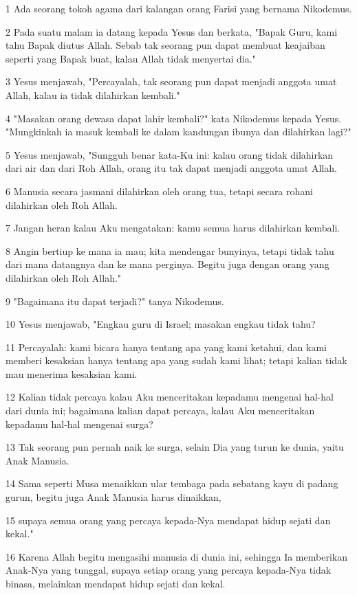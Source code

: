 \par 1 Ada seorang tokoh agama dari kalangan orang Farisi yang bernama Nikodemus.
\par 2 Pada suatu malam ia datang kepada Yesus dan berkata, "Bapak Guru, kami tahu Bapak diutus Allah. Sebab tak seorang pun dapat membuat keajaiban seperti yang Bapak buat, kalau Allah tidak menyertai dia."
\par 3 Yesus menjawab, "Percayalah, tak seorang pun dapat menjadi anggota umat Allah, kalau ia tidak dilahirkan kembali."
\par 4 "Masakan orang dewasa dapat lahir kembali?" kata Nikodemus kepada Yesus. "Mungkinkah ia masuk kembali ke dalam kandungan ibunya dan dilahirkan lagi?"
\par 5 Yesus menjawab, "Sungguh benar kata-Ku ini: kalau orang tidak dilahirkan dari air dan dari Roh Allah, orang itu tak dapat menjadi anggota umat Allah.
\par 6 Manusia secara jasmani dilahirkan oleh orang tua, tetapi secara rohani dilahirkan oleh Roh Allah.
\par 7 Jangan heran kalau Aku mengatakan: kamu semua harus dilahirkan kembali.
\par 8 Angin bertiup ke mana ia mau; kita mendengar bunyinya, tetapi tidak tahu dari mana datangnya dan ke mana perginya. Begitu juga dengan orang yang dilahirkan oleh Roh Allah."
\par 9 "Bagaimana itu dapat terjadi?" tanya Nikodemus.
\par 10 Yesus menjawab, "Engkau guru di Israel; masakan engkau tidak tahu?
\par 11 Percayalah: kami bicara hanya tentang apa yang kami ketahui, dan kami memberi kesaksian hanya tentang apa yang sudah kami lihat; tetapi kalian tidak mau menerima kesaksian kami.
\par 12 Kalian tidak percaya kalau Aku menceritakan kepadamu mengenai hal-hal dari dunia ini; bagaimana kalian dapat percaya, kalau Aku menceritakan kepadamu hal-hal mengenai surga?
\par 13 Tak seorang pun pernah naik ke surga, selain Dia yang turun ke dunia, yaitu Anak Manusia.
\par 14 Sama seperti Musa menaikkan ular tembaga pada sebatang kayu di padang gurun, begitu juga Anak Manusia harus dinaikkan,
\par 15 supaya semua orang yang percaya kepada-Nya mendapat hidup sejati dan kekal."
\par 16 Karena Allah begitu mengasihi manusia di dunia ini, sehingga Ia memberikan Anak-Nya yang tunggal, supaya setiap orang yang percaya kepada-Nya tidak binasa, melainkan mendapat hidup sejati dan kekal.

